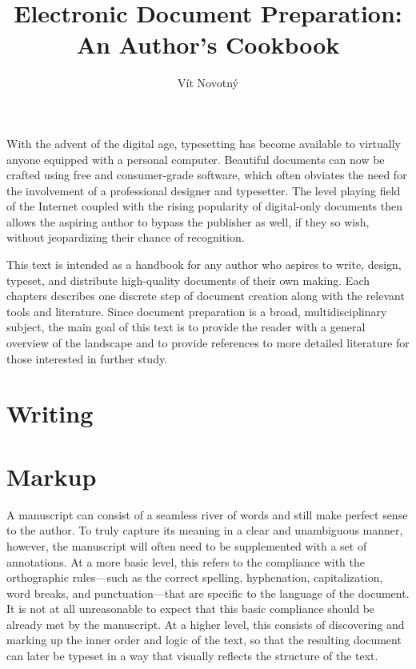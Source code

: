 \documentclass{book}
\begin{document}
\frontmatter
\title{Electronic Document Preparation: An Author's Cookbook}
\author{Vít Novotný}
\maketitle
\tableofcontents
\mainmatter

With the advent of the digital age, typesetting has become available to
virtually anyone equipped with a personal computer. Beautiful documents can now
be crafted using free and consumer-grade software, which often obviates the need
for the involvement of a professional designer and typesetter. The level playing
field of the Internet coupled with the rising popularity of digital-only
documents then allows the aspiring author to bypass the publisher as well, if
they so wish, without jeopardizing their chance of recognition.

This text is intended as a handbook for any author who aspires to write, design,
typeset, and distribute high-quality documents of their own making. Each
chapters describes one discrete step of document creation along with the
relevant tools and literature. Since document preparation is a broad,
multidisciplinary subject, the main goal of this text is to provide the reader
with a general overview of the landscape and to provide references to more
detailed literature for those interested in further study.

\chapter{Writing}

\chapter{Markup}
A manuscript can consist of a seamless river of words and still make perfect
sense to the author. To truly capture its meaning in a clear and unambiguous
manner, however, the manuscript will often need to be supplemented with a set of
annotations. At a more basic level, this refers to the compliance with the
orthographic rules---such as the correct spelling, hyphenation, capitalization,
word breaks, and punctuation---that are specific to the language of the document.
It is not at all unreasonable to expect that this basic compliance should be
already met by the manuscript. At a higher level, this consists of discovering
and marking up the inner order and logic of the text, so that the resulting
document can later be typeset in a way that visually reflects the structure of
the text.
\end{document}
